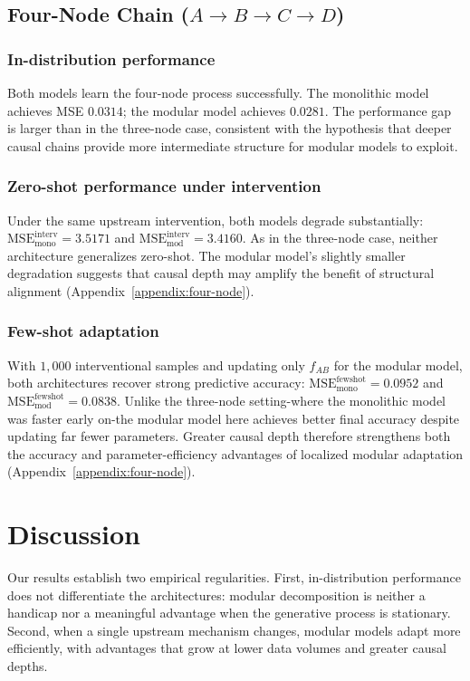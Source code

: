 \documentclass{article}
\begin{document}
\subsection{Four-Node Chain ($A \rightarrow B \rightarrow C \rightarrow D$)}
\label{sec:four-node-results}

\subsubsection{In-distribution performance}
Both models learn the four-node process successfully. The monolithic model achieves
MSE $0.0314$; the modular model achieves $0.0281$. The performance gap is larger
than in the three-node case, consistent with the hypothesis that deeper causal
chains provide more intermediate structure for modular models to exploit.

\subsubsection{Zero-shot performance under intervention}
Under the same upstream intervention, both models degrade substantially:
$\mathrm{MSE_{mono}^{interv}} = 3.5171$ and
$\mathrm{MSE_{mod}^{interv}} = 3.4160$.
As in the three-node case, neither architecture generalizes zero-shot. The modular
model's slightly smaller degradation suggests that causal depth may amplify the
benefit of structural alignment (Appendix~\ref{appendix:four-node}).

\subsubsection{Few-shot adaptation}
With $1{,}000$ interventional samples and updating only $f_{AB}$ for the modular
model, both architectures recover strong predictive accuracy:
$\mathrm{MSE_{mono}^{fewshot}} = 0.0952$ and
$\mathrm{MSE_{mod}^{fewshot}} = 0.0838$.
Unlike the three-node setting-where the monolithic model was faster early on-the
modular model here achieves better final accuracy despite updating far fewer
parameters. Greater causal depth therefore strengthens both the accuracy and
parameter-efficiency advantages of localized modular adaptation
(Appendix~\ref{appendix:four-node}).


\section{Discussion}
\label{sec:discussion}

Our results establish two empirical regularities. First, in-distribution
performance does not differentiate the architectures: modular decomposition is
neither a handicap nor a meaningful advantage when the generative process is
stationary. Second, when a single upstream mechanism changes, modular models adapt
more efficiently, with advantages that grow at lower data volumes and greater causal
depths.
\end{document}
